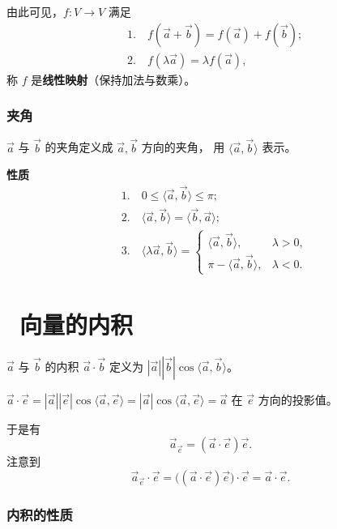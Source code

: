 \documentclass[UTF8,11pt]{ctexart}
\theoremstyle{cnthm}
\begin{document}
由此可见，$f:V\to V$ 满足
\[
\begin{aligned}
&1.\quad f(\vec a+\vec b)=f(\vec a)+f(\vec b);\\
&2.\quad f(\lambda\vec a)=\lambda f(\vec a),
\end{aligned}
\]
称 $f$ 是\textbf{线性映射}（保持加法与数乘）。

\subsubsection*{夹角}

$\vec a$ 与 $\vec b$ 的夹角定义成 $\vec a,\vec b$ 方向的夹角，
用 $\langle\vec a,\vec b\rangle$ 表示。

\textbf{性质}
\[
\begin{aligned}
&1.\quad 0\leq\langle\vec a,\vec b\rangle\leq\pi;\\
&2.\quad \langle\vec a,\vec b\rangle
=\langle\vec b,\vec a\rangle;\\
&3.\quad \langle\lambda\vec a,\vec b\rangle=
\begin{cases}
\langle\vec a,\vec b\rangle, & \lambda>0,\\
\pi-\langle\vec a,\vec b\rangle, & \lambda<0 .
\end{cases}
\end{aligned}
\]

\section{\ 向量的内积}

$\vec a$ 与 $\vec b$ 的内积 $\vec a\cdot\vec b$ 定义为
$|\vec a||\vec b|\cos\langle\vec a,\vec b\rangle$。

$\vec a\cdot\vec e
=|\vec a||\vec e|\cos\langle\vec a,\vec e\rangle
=|\vec a|\cos\langle\vec a,\vec e\rangle
=\vec a$ 在 $\vec e$ 方向的投影值。

于是有
\[
\vec a_{\vec e}=(\vec a\cdot\vec e)\vec e .
\]
注意到
\[
\vec a_{\vec e}\cdot\vec e
=\bigl((\vec a\cdot\vec e)\vec e\bigr)\cdot\vec e
=\vec a\cdot\vec e .
\]

\subsubsection*{内积的性质}
\end{document}
